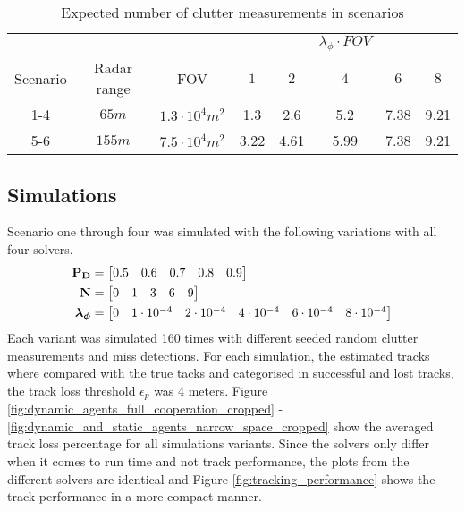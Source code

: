 \begin{table}
\centering
\begin{tabular}{c c c c c c c c}
			&				&						& & &$\lambda_\phi \cdot FOV$& 	&		\\
Scenario 	& Radar range	& FOV					& $1$ 	& $2$ 	& $4$ 	&$6$ 	& $8$	\\ \hline
1-4		 	& $65 m$ 		& $1.3\cdot10^4 m^2$	& 1.3 	& 2.6 	& 5.2 	& 7.38 	& 9.21 	\\
5-6		 	& $155 m$		& $7.5\cdot10^4 m^2$	& 3.22 	& 4.61 	& 5.99 	& 7.38 	& 9.21 					
\end{tabular}
\caption{Expected number of clutter measurements in scenarios}
\label{tab:clutter_measurements}
\end{table}

\subsection{Simulations}
Scenario one through four was simulated with the following variations with all four solvers.
\begin{equation*}
\begin{split}
\boldsymbol{\mathbf{P_D}} &= \begin{bmatrix} 0.5 & 0.6 & 0.7 & 0.8 & 0.9 \end{bmatrix} \\
\boldsymbol{\mathbf{N}} &=\begin{bmatrix} 0 & 1 & 3 & 6 & 9 \end{bmatrix} \\
\boldsymbol{\mathbf{\lambda_\phi}} &=\begin{bmatrix} 0 & 1\cdot10^{-4} & 2\cdot10^{-4} & 4\cdot10^{-4} & 6\cdot10^{-4} & 8\cdot10^{-4} \end{bmatrix}
\end{split}
\end{equation*}
Each variant was simulated 160 times with different seeded random clutter measurements and miss detections. For each simulation, the estimated tracks where compared with the true tacks and categorised in successful and lost tracks, the track loss threshold $\epsilon_p$ was $4$ meters. Figure \ref{fig:dynamic_agents_full_cooperation_cropped} - \ref{fig:dynamic_and_static_agents_narrow_space_cropped} show the averaged track loss percentage for all simulations variants. Since the solvers only differ when it comes to run time and not track performance, the plots from the different solvers are identical and Figure \ref{fig:tracking_performance} shows the track performance in a more compact manner. 
